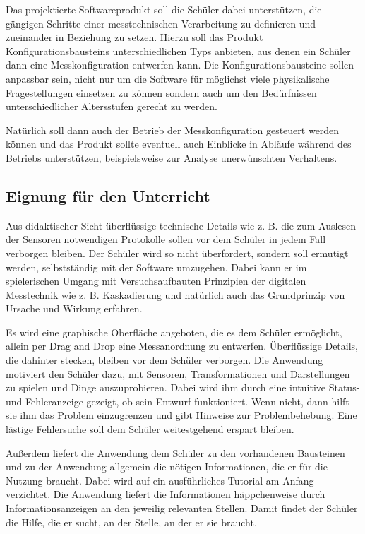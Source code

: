 \documentclass[parskip=full]{scrartcl}
\begin{document}
Das projektierte Softwareprodukt soll die Schüler dabei unterstützen, die gängigen Schritte einer messtechnischen Verarbeitung zu definieren und zueinander in Beziehung zu setzen. Hierzu soll das Produkt \glspl{Konfigurationsbaustein} unterschiedlichen Typs anbieten, aus denen ein Schüler dann eine Messkonfiguration entwerfen kann. Die Konfigurationsbausteine sollen anpassbar sein, nicht nur um die Software für möglichst viele physikalische Fragestellungen einsetzen zu können sondern auch um den Bedürfnissen unterschiedlicher Altersstufen gerecht zu werden. 

Natürlich soll dann auch der Betrieb der Messkonfiguration gesteuert werden können und das Produkt sollte eventuell auch Einblicke in Abläufe während des Betriebs unterstützen, beispielsweise zur Analyse unerwünschten Verhaltens.

\subsection{Eignung für den Unterricht}

Aus didaktischer Sicht überflüssige technische Details wie z. B. die zum Auslesen der Sensoren notwendigen Protokolle sollen vor dem Schüler in jedem Fall verborgen bleiben.
Der Schüler wird so nicht überfordert, sondern soll ermutigt werden, selbstständig mit der Software umzugehen. 
Dabei kann er im spielerischen Umgang mit Versuchsaufbauten Prinzipien der digitalen Messtechnik wie z. B. Kaskadierung und natürlich auch das Grundprinzip von Ursache und Wirkung erfahren.

Es wird eine graphische Oberfläche angeboten, die es dem Schüler ermöglicht, allein per Drag and Drop eine Messanordnung zu entwerfen. 
Überflüssige Details, die dahinter stecken, bleiben vor dem Schüler verborgen.
Die Anwendung motiviert den Schüler dazu, mit Sensoren, Transformationen und Darstellungen zu spielen und Dinge auszuprobieren. 
Dabei wird ihm durch eine intuitive Status- und Fehleranzeige gezeigt, ob sein Entwurf funktioniert. 
Wenn nicht, dann hilft sie ihm das Problem einzugrenzen und gibt Hinweise zur Problembehebung. 
Eine lästige Fehlersuche soll dem Schüler weitestgehend erspart bleiben. 

Außerdem liefert die Anwendung dem Schüler zu den vorhandenen Bausteinen und zu der Anwendung allgemein die nötigen Informationen, die er für die Nutzung braucht. Dabei wird auf ein ausführliches Tutorial am Anfang verzichtet. Die Anwendung liefert die Informationen häppchenweise durch Informationsanzeigen an den jeweilig relevanten Stellen. Damit findet der Schüler die Hilfe, die er sucht, an der Stelle, an der er sie braucht.
\end{document}
